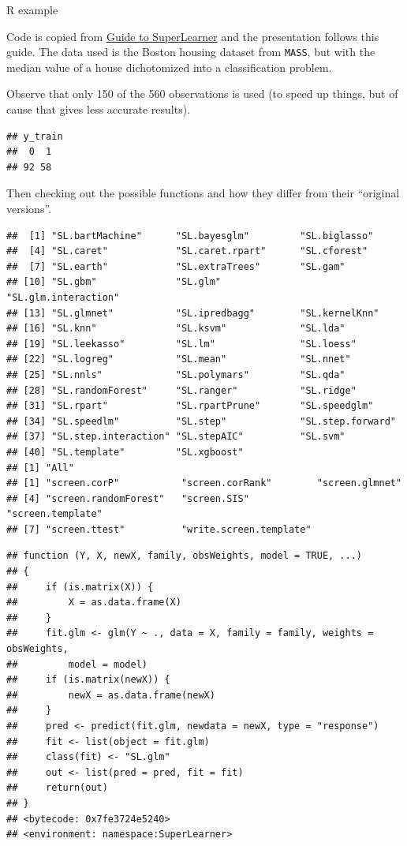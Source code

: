 \documentclass[
  ignorenonframetext,
]{beamer}
\begin{document}
\begin{frame}[fragile]

\begin{block}{R example}

Code is copied from \href{}{Guide to SuperLearner} and the presentation
follows this guide. The data used is the Boston housing dataset from
\texttt{MASS}, but with the median value of a house dichotomized into a
classification problem.

Observe that only 150 of the 560 observations is used (to speed up
things, but of cause that gives less accurate results).

\begin{verbatim}
## y_train
##  0  1 
## 92 58
\end{verbatim}

Then checking out the possible functions and how they differ from their
``original versions''.

\begin{verbatim}
##  [1] "SL.bartMachine"      "SL.bayesglm"         "SL.biglasso"        
##  [4] "SL.caret"            "SL.caret.rpart"      "SL.cforest"         
##  [7] "SL.earth"            "SL.extraTrees"       "SL.gam"             
## [10] "SL.gbm"              "SL.glm"              "SL.glm.interaction" 
## [13] "SL.glmnet"           "SL.ipredbagg"        "SL.kernelKnn"       
## [16] "SL.knn"              "SL.ksvm"             "SL.lda"             
## [19] "SL.leekasso"         "SL.lm"               "SL.loess"           
## [22] "SL.logreg"           "SL.mean"             "SL.nnet"            
## [25] "SL.nnls"             "SL.polymars"         "SL.qda"             
## [28] "SL.randomForest"     "SL.ranger"           "SL.ridge"           
## [31] "SL.rpart"            "SL.rpartPrune"       "SL.speedglm"        
## [34] "SL.speedlm"          "SL.step"             "SL.step.forward"    
## [37] "SL.step.interaction" "SL.stepAIC"          "SL.svm"             
## [40] "SL.template"         "SL.xgboost"         
## [1] "All"
## [1] "screen.corP"           "screen.corRank"        "screen.glmnet"        
## [4] "screen.randomForest"   "screen.SIS"            "screen.template"      
## [7] "screen.ttest"          "write.screen.template"
\end{verbatim}

\begin{verbatim}
## function (Y, X, newX, family, obsWeights, model = TRUE, ...) 
## {
##     if (is.matrix(X)) {
##         X = as.data.frame(X)
##     }
##     fit.glm <- glm(Y ~ ., data = X, family = family, weights = obsWeights, 
##         model = model)
##     if (is.matrix(newX)) {
##         newX = as.data.frame(newX)
##     }
##     pred <- predict(fit.glm, newdata = newX, type = "response")
##     fit <- list(object = fit.glm)
##     class(fit) <- "SL.glm"
##     out <- list(pred = pred, fit = fit)
##     return(out)
## }
## <bytecode: 0x7fe3724e5240>
## <environment: namespace:SuperLearner>
\end{verbatim}


\end{block}
\end{frame}
\end{document}
